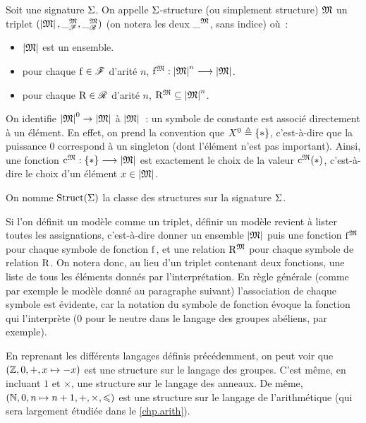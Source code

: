 \begin{definition}[Structure]
  Soit une signature $\Sigma$. On appelle $\Sigma$-structure (ou simplement
  structure) $\mathfrak{M}$ un triplet
  $(\left\vert \mathfrak{M}\right\vert,\mathord{\_}^{\mathfrak{M}}_{\mathscr F},\mathord{\_}^{\mathfrak{M}}_{\mathscr R})$
  (on notera les deux $\mathord{\_}^{\mathfrak{M}}$, sans indice) où~:
  \begin{itemize}
  \item $\left\vert \mathfrak{M}\right\vert$ est un ensemble.
  \item pour chaque $\mathrm{f}\in\mathscr F$ d'arité $n$,
    $\mathrm{f}^{\mathfrak{M}} : \displaystyle \left\vert \mathfrak{M}\right\vert^n \longrightarrow \left\vert \mathfrak{M}\right\vert$.
  \item pour chaque $\mathrm{R}\in\mathscr R$ d'arité $n$,
    $\mathrm{R}^{\mathfrak{M}} \subseteq \left\vert \mathfrak{M}\right\vert^n$.
  \end{itemize}

  \noindent
  On identifie $\left\vert \mathfrak{M}\right\vert^0 \to \left\vert \mathfrak{M}\right\vert$ à $\left\vert \mathfrak{M}\right\vert$~: un symbole
  de constante est associé directement à un élément. En effet, on prend la
  convention que $X^0 \triangleq \{*\}$, c'est-à-dire que la puissance $0$
  correspond à un singleton (dont l'élément n'est pas important). Ainsi, une
  fonction $\mathrm{c}^{\mathfrak{M}} : \displaystyle \{*\} \longrightarrow \left\vert \mathfrak{M}\right\vert$ est exactement le choix de
  la valeur $\mathrm{c}^{\mathfrak{M}}(*)$, c'est-à-dire le choix d'un élément $x \in \left\vert \mathfrak{M}\right\vert$.

  On nomme $\operatorname{Struct}(\Sigma)$ la classe des structures sur la signature $\Sigma$.
\end{definition}

\begin{remark}
  Si l'on définit un modèle comme un triplet, définir un modèle revient à lister
  toutes les assignations, c'est-à-dire donner un ensemble $\left\vert \mathfrak{M}\right\vert$ puis
  une fonction $\mathrm{f}^{\mathfrak{M}}$ pour chaque symbole de fonction $\mathrm{f}$, et
  une relation $\mathrm{R}^{\mathfrak{M}}$ pour chaque symbole de relation $\mathrm{R}$. On
  notera donc, au lieu d'un triplet contenant deux fonctions, une liste de
  tous les éléments donnés par l'interprétation. En règle générale (comme par
  exemple le modèle donné au paragraphe suivant) l'association de chaque symbole
  est évidente, car la notation du symbole de fonction évoque la fonction qui
  l'interprète ($0$ pour le neutre dans le langage des groupes abéliens, par
  exemple).
\end{remark}

\begin{example}
  En reprenant les différents langages définis précédemment, on peut voir que
  $(\mathbb Z,0,+,x\mapsto -x)$ est une structure sur le langage des groupes.
  C'est même, en incluant $1$ et $\times$, une structure sur le langage des
  anneaux. De même, $(\mathbb N,0,n\mapsto n + 1,+,\times,\leqslant)$ est une structure sur
  le langage de l'arithmétique (qui sera largement étudiée dans le
  \cref{chp.arith}).
\end{example}

